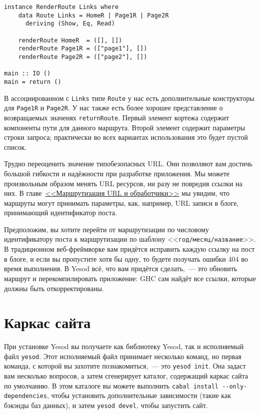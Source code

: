 \begin{lstlisting}
instance RenderRoute Links where
    data Route Links = HomeR | Page1R | Page2R
      deriving (Show, Eq, Read)

    renderRoute HomeR  = ([], [])
    renderRoute Page1R = (["page1"], [])
    renderRoute Page2R = (["page2"], [])

main :: IO ()
main = return ()
\end{lstlisting}

В ассоциированном с \lstinline!Links! типе \lstinline!Route! у нас есть дополнительные
конструкторы для \lstinline!Page1R! и \lstinline!Page2R!. У нас также есть более хорошее
представление о возвращаемых значенях \lstinline!returnRoute!. Первый элемент кортежа содержит
компоненты пути для данного маршрута. Второй элемент содержит параметры строки запроса;
практически во всех вариантах использования это будет пустой список.

Трудно переоценить значение типобезопасных URL. Они позволяют вам достичь большой гибкости
и надёжности при разработке приложения. Мы можете произвольным образом менять URL
ресурсов, ни разу не повредив ссылки на них. В главе~\hyperref[chap:routing]{<<Маршрутизация
  URL и обработчики>>} мы увидим, что маршруты могут принимать параметры, как, например,
URL записи в блоге, принимающий идентификатор поста.

Предположим, вы хотите перейти от маршрутизации по числовому идентификатору поста к
маршрутизации по шаблону <<\texttt{год/месяц/название}>>. В традиционном веб-фреймворке
вам придётся исправить каждую ссылку на пост в блоге, и если вы пропустите хотя бы одну,
то будете получать ошибки 404 во время выполнения. В Yesod всё, что вам придётся сделать,~---
это обновить маршрут и перекомпилировать приложение: GHC сам найдёт все ссылки,
которые должны быть откорректированы.

\section{Каркас сайта}

При установке Yesod вы получаете как библиотеку Yesod, так и исполняемый файл
\lstinline!yesod!. Этот исполняемый файл принимает несколько команд, но первая команда, с
которой вы захотите познакомиться,~--- это \lstinline!yesod init!. Она задаст вам
несколько вопросов, а затем сгенерирует каталог, содержащий каркас сайта по умолчанию. В
этом каталоге вы можете выполнить \lstinline'cabal install --only-dependencies', чтобы
установить дополнительные зависимости (такие как бэкэнды баз данных), и затем
\lstinline'yesod devel', чтобы запустить сайт.

